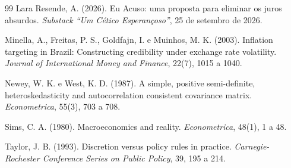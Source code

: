 \documentclass[11pt,a4paper]{article}
\begin{document}
\begin{thebibliography}{99}
Lara Resende, A. (2026). Eu Acuso: uma proposta para eliminar os juros
absurdos. \emph{Substack ``Um Cético Esperançoso''}, 25 de setembro de 2026.

Minella, A., Freitas, P. S., Goldfajn, I. e Muinhos, M. K. (2003).
Inflation targeting in Brazil: Constructing credibility under exchange
rate volatility. \emph{Journal of International Money and Finance}, 22(7),
1015 a 1040.

Newey, W. K. e West, K. D. (1987). A simple, positive semi-definite,
heteroskedasticity and autocorrelation consistent covariance matrix.
\emph{Econometrica}, 55(3), 703 a 708.

Sims, C. A. (1980). Macroeconomics and reality. \emph{Econometrica},
48(1), 1 a 48.

Taylor, J. B. (1993). Discretion versus policy rules in practice.
\emph{Carnegie-Rochester Conference Series on Public Policy}, 39,
195 a 214.

\end{thebibliography}
\end{document}
